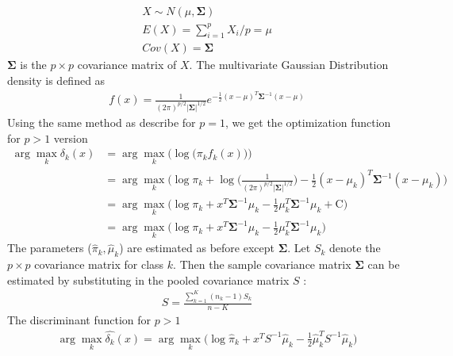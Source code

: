 \documentclass[12pt,a4paper]{article}%
\theoremstyle{definition}
\theoremstyle{plain}
\numberwithin{equation}{section}
\begin{document}
\begin{gather*}
X \sim N(\mu,\boldsymbol{\Sigma}) \\
E(X) = \sum\limits_{i=1}^{p} X_{i}/p = \mu \\
Cov(X) = \boldsymbol{\Sigma}
\end{gather*}
$\boldsymbol{\Sigma}$ is the $p \times p$ covariance matrix of $X$. The multivariate Gaussian Distribution density is defined as
\begin{gather*}
f(x) = \frac{1}{(2 \pi)^{p/2}|\boldsymbol{\Sigma}|^{1/2}} e^{-\frac{1}{2}(x-\mu)^{T}\boldsymbol{\Sigma}^{-1}(x-\mu)}
\end{gather*}
Using the same method as describe for $p=1$, we get the optimization function for $p > 1 $ version 
\begin{align*}
\arg\max_{k}  \delta_{k}(x) &= \arg\max_{k} \bigg( \log \big(\pi_{k}f_{k}(x)\big) \bigg)\\
							&= \arg\max_{k} \bigg( \log \pi_{k} + \log \big(\frac{1}{(2 \pi)^{p/2}|\boldsymbol{\Sigma}|^{1/2}}\big)-\frac{1}{2}(x-\mu_{k})^{T}\boldsymbol{\Sigma}^{-1}(x-\mu_{k}) \bigg)\\
 						    &= \arg\max_{k} \bigg( \log \pi_{k} + x^{T}\boldsymbol{\Sigma}^{-1}\mu_{k}-\frac{1}{2}\mu_{k}^{T}\boldsymbol{\Sigma}^{-1}\mu_{k} + \text{C} \bigg) \\
 						    &= \arg\max_{k} \bigg( \log \pi_{k} + x^{T}\boldsymbol{\Sigma}^{-1}\mu_{k}-\frac{1}{2}\mu_{k}^{T}\boldsymbol{\Sigma}^{-1}\mu_{k} \bigg)
\end{align*}
The parameters ($\hat{\pi}_{k}, \hat{\mu}_{k}$) are estimated as before except $\boldsymbol{\Sigma}$.
Let $S_{k}$ denote the $p \times p$ covariance matrix for class $k$. 
Then the sample covariance matrix $\boldsymbol{\Sigma}$ can be estimated by substituting in the pooled covariance matrix $S$ :
\begin{gather*}
S = \frac{\sum\limits_{k=1}^{K} (n_{k}-1)S_{k}}{n-K}
\end{gather*}
The discriminant function for $p>1$
\begin{gather*}
\arg\max_{k}  \hat{\delta_{k}}(x) = \arg\max_{k} \bigg( \log \hat{\pi}_{k} + x^{T} S^{-1} \hat{\mu}_{k} - \frac{1}{2} \hat{\mu}_{k}^{T} S^{-1} \hat{\mu}_{k} \bigg)
\end{gather*}
\end{document}

